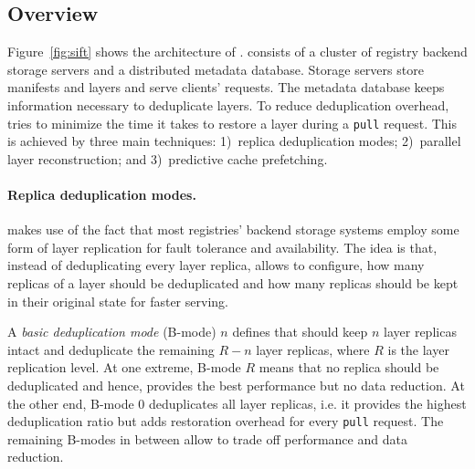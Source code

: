 \subsection{Overview}
\label{sec:overview}





Figure~\ref{fig:sift} shows the architecture of \sysname.
%
\sysname consists of a cluster of registry backend storage servers and a
distributed metadata database. 
%
Storage servers store manifests and layers and serve clients' requests.
%
The metadata database keeps information necessary to deduplicate layers.
%
To reduce deduplication overhead, \sysname tries to minimize the time it takes
to restore a layer during a \texttt{pull} request.
%
This is achieved by three main techniques: 1)~replica deduplication modes; 2)~parallel
layer reconstruction; and 3)~predictive cache prefetching.





\paragraph{Replica deduplication modes.}
%
\sysname makes use of the fact that most registries' backend storage systems
employ some form of layer replication for fault tolerance and availability.
%
The idea is that, instead of deduplicating every layer replica, \sysname allows
to configure, how many replicas of a layer should be deduplicated and how many
replicas should be kept in their original state for faster serving.

A \emph{basic deduplication mode} (B-mode) $n$ defines that \sysname should
keep $n$ layer replicas intact and deduplicate the remaining $R-n$ layer
replicas, where $R$ is the layer replication level.
%
%
At one extreme, B-mode $R$ means that no replica should be deduplicated and
hence, provides the best performance but no data reduction.
%
At the other end, B-mode $0$ deduplicates all layer replicas, i.e. it provides
the highest deduplication ratio but adds restoration overhead for every
\texttt{pull} request.
%
The remaining B-modes in between allow to trade off performance and data
reduction.
%

